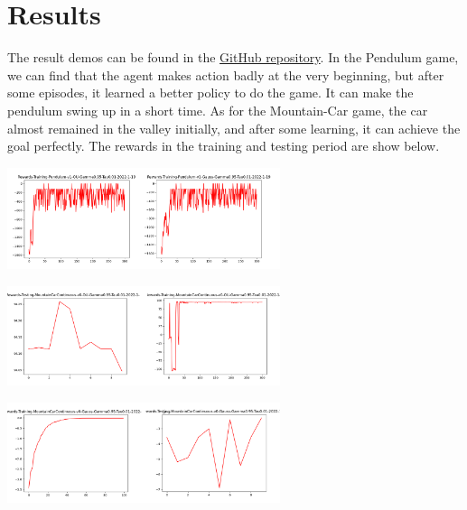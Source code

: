 \documentclass[a4paper,12pt,oneside,article]{memoir}
\begin{document}
\chapter{Results}
The result demos can be found in the \href{https://github.com/zeng798473532/DDPG-RL-final}{GitHub repository}. In the Pendulum game, we can find that the agent makes action badly at the very beginning, but after some episodes, it learned a better policy to do the game. It can make the pendulum swing up in a short time. As for the Mountain-Car game, the car almost remained in the valley initially, and after some learning, it can achieve the goal perfectly. The rewards in the training and testing period are show below.

\begin{center}
\includegraphics[width=8cm]{res1.png}
\label{fig:res1}
\end{center}

\begin{center}
\includegraphics[width=8cm]{res2.png}
\label{fig:res2}
\end{center}

\begin{center}
\includegraphics[width=8cm]{res3.png}
\label{fig:res3}
\end{center}
\end{document}
